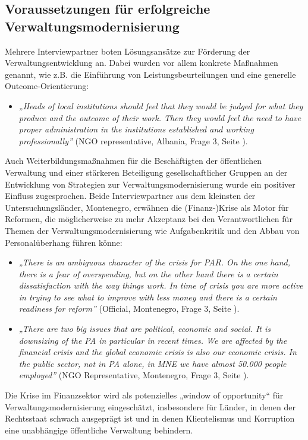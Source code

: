 \subsection{Voraussetzungen für erfolgreiche Verwaltungsmodernisierung }
Mehrere Interviewpartner boten Lösungsansätze zur Förderung der Verwaltungsentwicklung an. Dabei wurden vor allem konkrete Maßnahmen genannt, wie z.B. die Einführung von Leistungsbeurteilungen und eine generelle Outcome-Orientierung:
\begin{itemize}[label={}]
\item \textit{„Heads of local institutions should feel that they would be judged for what they produce and the outcome of their work. Then they would feel the need to have proper administration in the institutions established and working professionally”} (NGO representative, Albania, Frage 3, Seite \pageref{sec:par montenegro}).
\end{itemize}
Auch Weiterbildungsmaßnahmen für die Beschäftigten der öffentlichen Verwaltung und einer stärkeren Beteiligung gesellschaftlicher Gruppen an der Entwicklung von Strategien zur Verwaltungsmodernisierung wurde ein positiver Einfluss zugesprochen. Beide Interviewpartner aus dem kleinsten der Untersuchungsländer, Montenegro, erwähnen die (Finanz-)Krise als Motor für Reformen, die möglicherweise zu mehr Akzeptanz bei den Verantwortlichen für Themen der Verwaltungsmodernisierung wie Aufgabenkritik und den Abbau von Personalüberhang führen könne:
\begin{itemize}[label={}]
\item \textit{„There is an ambiguous character of the crisis for PAR. On the one hand, there is a fear of overspending, but on the other hand there is a certain dissatisfaction with the way things work. In time of crisis you are more active in trying to see what to improve with less money and there is a certain readiness for reform”} (Official, Montenegro, Frage 3, Seite \pageref{sec:par montenegro}).
\item \textit{„There are two big issues that are political, economic and social. It is downsizing of the PA in particular in recent times. We are affected by the financial crisis and the global economic crisis is also our economic crisis. In the public sector, not in PA alone, in MNE we have almost 50.000 people employed”} (NGO Representative, Montenegro, Frage 3, Seite \pageref{sec:par montenegro}).
\end{itemize}
Die Krise im Finanzsektor wird als potenzielles „window of opportunity“ für Verwaltungsmodernisierung eingeschätzt, insbesondere für Länder, in denen der Rechtsstaat schwach ausgeprägt ist und in denen Klientelismus und Korruption eine unabhängige öffentliche Verwaltung behindern.\par

